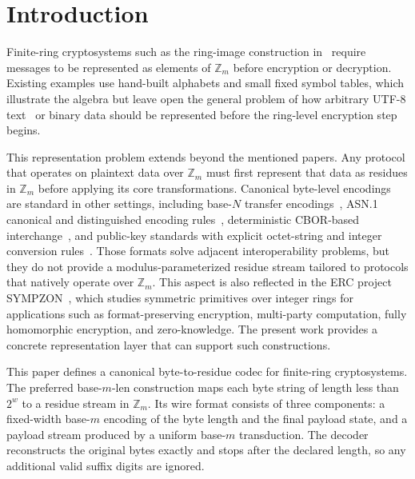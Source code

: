 \documentclass{system-security-article}
\newcommand{\Zm}{\ensuremath{\mathbb{Z}_m}}
\newcommand{\BaseM}{base-\(m\)}
\newcommand{\BaseMLen}{\BaseM{}-len}
\begin{document}
    \section{Introduction}
    \label{sec:intro}

    Finite-ring cryptosystems such as the ring-image construction in~\cite{kryvyi2025symmetric}
    require messages to be represented as elements of \(\Zm\) before encryption or decryption.
    Existing examples use hand-built alphabets and small fixed symbol tables, which illustrate the algebra
    but leave open the general problem of how arbitrary UTF-8 text~\cite{rfc3629}
    or binary data should be represented before the ring-level encryption step begins.

    This representation problem extends beyond the mentioned papers.
    Any protocol that operates on plaintext data over \(\Zm\) must first represent that
    data as residues in \(\Zm\) before applying its core transformations.
    Canonical byte-level encodings are standard in other settings, including base-\(N\) transfer encodings~\cite{rfc4648},
    ASN.1 canonical and distinguished encoding rules~\cite{x690}, deterministic CBOR-based interchange~\cite{rfc8949},
    and public-key standards with explicit octet-string and integer conversion rules~\cite{rfc8017}.
    Those formats solve adjacent interoperability problems, but they do not provide a modulus-parameterized residue
    stream tailored to protocols that natively operate over \(\Zm\).
    This aspect is also reflected in the ERC project SYMPZON~\cite{sympzon}, which studies symmetric
    primitives over integer rings for applications such as format-preserving encryption,
    multi-party computation, fully homomorphic encryption, and zero-knowledge.
    The present work provides a concrete representation layer that can support such constructions.

    This paper defines a canonical byte-to-residue codec for finite-ring cryptosystems.
    The preferred \BaseMLen{} construction maps each byte string of length less than \(2^{w}\) to a residue stream in \(\Zm\).
    Its wire format consists of three components: a fixed-width base-\(m\) encoding of the byte length and the final
    payload state, and a payload stream produced by a uniform base-\(m\) transduction.
    The decoder reconstructs the original bytes exactly and stops after the declared length,
    so any additional valid suffix digits are ignored.
\end{document}
